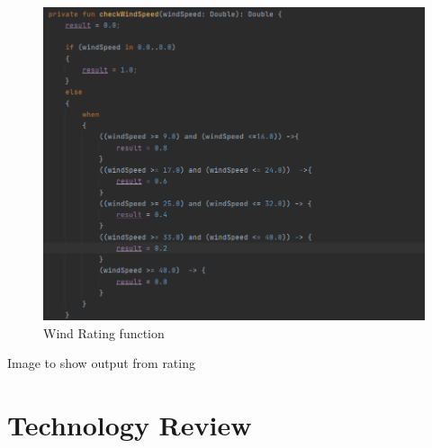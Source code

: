 \begin{figure}[H]
    \centering
    \includegraphics[width=12cm]{img/starEx.PNG}
    \caption{Wind Rating function}
    \label{fig:Wind Rating function}
\end{figure}

Image to show output from rating

\chapter{Technology Review}
